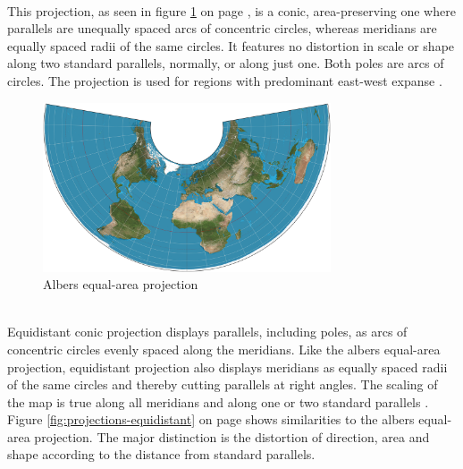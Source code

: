 \begin{enumerate}
 \hfill \\
This projection, as seen in figure \ref{fig:projections-albers-ea} on page \pageref{fig:projections-albers-ea}, is a conic, area-preserving one where parallels are unequally spaced arcs of concentric circles, whereas meridians are equally spaced radii of the same circles. It features no distortion in scale or shape along two standard parallels, normally, or along just one. Both poles are arcs of circles. The projection is used for regions with predominant east-west expanse .

\begin{figure}[!htb]
\centering
\includegraphics[height=5cm,keepaspectratio]{images/methods/projections/albers.jpg}
\caption[
    Albers equal-area projection, Urldate: 07.2016 \newline
    \small\texttt{\url{https://upload.wikimedia.org/wikipedia/commons/1/1f/Albers_projection_SW.jpg}}.
]{Albers equal-area projection}
\label{fig:projections-albers-ea}
\end{figure}

 \hfill \\
Equidistant conic projection displays parallels, including poles, as arcs of concentric circles evenly spaced along the meridians. Like the albers equal-area projection, equidistant projection also displays meridians as equally spaced radii of the same circles and thereby cutting parallels at right angles. The scaling of the map is true along all meridians and along one or two standard parallels . Figure \ref{fig:projections-equidistant} on page \pageref{fig:projections-equidistant} shows similarities to the albers equal-area projection. The major distinction is the distortion of direction, area and shape according to the distance from standard parallels.


\end{enumerate}
